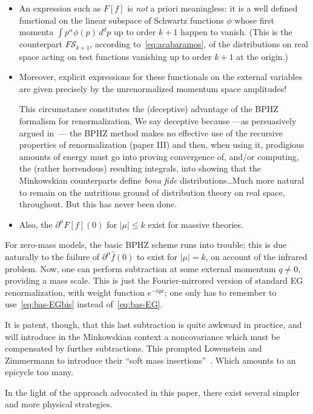 \documentclass[a4paper,12pt]{article}
\renewcommand{\a}{\alpha}          %
\newcommand{\del}{\partial}        %
\renewcommand{\SS}{\mathcal{S}}    %
\newcommand{\7}{\dagger}           %
\theoremstyle{plain}
\theoremstyle{definition}
\begin{document}
\begin{itemize}
\item
An expression such as $F[f]$ is \textit{not} a priori meaningless: it
is a well defined functional on the linear subspace of Schwartz
functions $\phi$ whose first momenta $\int p^\a\phi(p)\,d^d p$ up to
order $k+1$ happen to vanish. (This is the counterpart $F\SS_{k+1}$,
according to~\eqref{eq:acabaramos}, of the distributions on real space
acting on test functions vanishing up to order $k+1$ at the origin.)

\item
Moreover, explicit expressions for these functionals on the external
variables are given precisely by the unrenormalized momentum space
amplitudes!

This circumstance constitutes the (deceptive) advantage of the BPHZ
formalism for renormalization. We say deceptive because ---as
persuasively argued in~\cite{ThreefromRussia}--- the BPHZ method makes
no effective use of the recursive properties of renormalization (paper
III) and then, when using it, prodigious amounts of energy must go
into proving convergence of, and/or computing, the (rather horrendous)
resulting integrals, into showing that the Minkowskian counterparts
define \textit{bona fide} distributions\dots Much more natural to
remain on the nutritious ground of distribution theory on real space,
throughout. But this has never been done.

\item
Also, the $\del^\mu F[f](0)$ for $|\mu| \leq k$ exist for massive
theories.
\end{itemize}

For zero-mass models, the basic BPHZ scheme runs into trouble; this is
due naturally to the failure of $\del^\mu\hat f(0)$ to exist for
$|\mu|=k$, on account of the infrared problem. Now, one can perform
subtraction at some external momentum $q\neq0$, providing a mass
scale. This is just the Fourier-mirrored version of standard EG
renormalization, with weight function $e^{-iqx}$; one only has to
remember to use~\eqref{eq:bas-EGbis} instead of~\eqref{eq:bas-EG}.

It is patent, though, that this last subtraction is quite awkward in
practice, and will introduce in the Minkowskian context a
noncovariance which must be compensated by further subtractions. This
prompted Lowenstein and Zimmermann to introduce their ``soft mass
insertions''~\cite{LowZim}. Which amounts to an epicycle too many.

In the light of the approach advocated in this paper, there exist
several simpler and more physical strategies.
\end{document}
